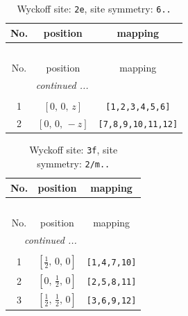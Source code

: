 \documentclass[fleqn,8pt]{jsarticle}
\begin{document}
\begin{longtable}{ccc}
\caption{Wyckoff site: {\tt 2e}, site symmetry: {\tt 6..}}
 \\
 \hline \hline
No. & position & mapping \\ \hline \endfirsthead

\multicolumn{2}{l}{\tablename\ \thetable{}} \\
 \hline \hline
No. & position & mapping \\ \hline \endhead

 \hline \hline
\multicolumn{2}{r}{\footnotesize\it continued ...} \\ \endfoot

 \hline \hline
\multicolumn{2}{r}{} \\ \endlastfoot

1 & $\left[ 0,\, 0,\, z \right]$ & {\tt [1,2,3,4,5,6]} \\ \hline
2 & $\left[ 0,\, 0,\, - z \right]$ & {\tt [7,8,9,10,11,12]} \\
\end{longtable}
\renewcommand{\arraystretch}{1.2}
\begin{longtable}{ccc}
\caption{Wyckoff site: {\tt 3f}, site symmetry: {\tt 2/m..}}
 \\
 \hline \hline
No. & position & mapping \\ \hline \endfirsthead

\multicolumn{2}{l}{\tablename\ \thetable{}} \\
 \hline \hline
No. & position & mapping \\ \hline \endhead

 \hline \hline
\multicolumn{2}{r}{\footnotesize\it continued ...} \\ \endfoot

 \hline \hline
\multicolumn{2}{r}{} \\ \endlastfoot

1 & $\left[ \frac{1}{2},\, 0,\, 0 \right]$ & {\tt [1,4,7,10]} \\ \hline
2 & $\left[ 0,\, \frac{1}{2},\, 0 \right]$ & {\tt [2,5,8,11]} \\ \hline
3 & $\left[ \frac{1}{2},\, \frac{1}{2},\, 0 \right]$ & {\tt [3,6,9,12]} \\
\end{longtable}
\renewcommand{\arraystretch}{1.2}
\end{document}
